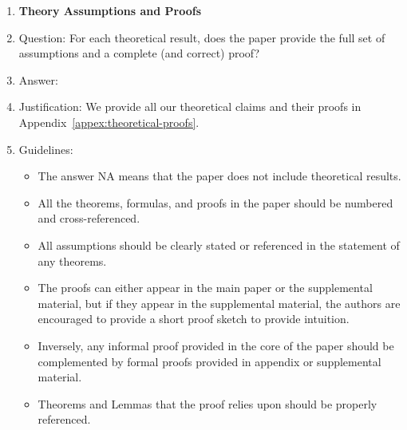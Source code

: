 \documentclass{article}
\theoremstyle{plain}
\theoremstyle{definition}
\theoremstyle{remark}
\begin{document}
\begin{enumerate}
\item {\bf Theory Assumptions and Proofs}
    \item[] Question: For each theoretical result, does the paper provide the full set of assumptions and a complete (and correct) proof?
    \item[] Answer: \answerYes{} %
    \item[] Justification: We provide all our theoretical claims and their proofs in Appendix~\ref{appex:theoretical-proofs}.
    \item[] Guidelines:
    \begin{itemize}
        \item The answer NA means that the paper does not include theoretical results. 
        \item All the theorems, formulas, and proofs in the paper should be numbered and cross-referenced.
        \item All assumptions should be clearly stated or referenced in the statement of any theorems.
        \item The proofs can either appear in the main paper or the supplemental material, but if they appear in the supplemental material, the authors are encouraged to provide a short proof sketch to provide intuition. 
        \item Inversely, any informal proof provided in the core of the paper should be complemented by formal proofs provided in appendix or supplemental material.
        \item Theorems and Lemmas that the proof relies upon should be properly referenced. 
    \end{itemize}


\end{enumerate}
\end{document}

